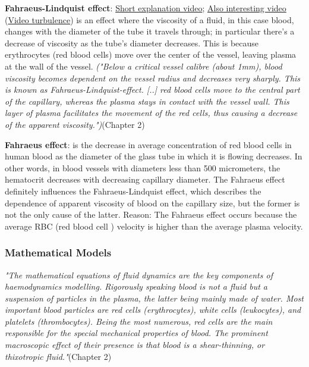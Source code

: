 \documentclass[11pt,letterpaper]{article}
\begin{document}
\textbf{Fahraeus-Lindquist effect}: \href{https://www.youtube.com/watch?v=IDrHCGcq-ak}{Short explanation video}; \href{https://www.combster.tv/t/1317657-fhruslindqvist-effect?utm_source=spectroom_web&utm_medium=banner&utm_campaign=cross_promo}{Also interesting video} (\href{https://www.youtube.com/watch?v=sWfCKdjxLc0}{Video turbulence}) \newline
is an effect where the viscosity of a fluid, in this case blood, changes with the diameter of the tube it travels through; in particular there's a decrease of viscosity as the tube's diameter decreases. This is because erythrocytes (red blood cells) move over the center of the vessel, leaving plasma at the wall of the vessel. \textit{("Below a critical vessel calibre (about 1mm), blood viscosity becomes dependent on the vessel radius and decreases very sharply. This is known as Fahraeus-Lindquist-effect. [..] red blood cells move to the central part of the capillary, whereas the plasma stays in contact with the vessel wall. This layer of plasma facilitates the movement of the red cells, thus causing a decrease of the apparent viscosity.")}(Chapter 2)

\textbf{Fahraeus effect}:  is the decrease in average concentration of red blood cells in human blood as the diameter of the glass tube in which it is flowing decreases. In other words, in blood vessels with diameters less than 500 micrometers, the hematocrit decreases with decreasing capillary diameter. The Fahraeus effect definitely influences the Fahraeus-Lindquist effect, which describes the dependence of apparent viscosity of blood on the capillary size, but the former is not the only cause of the latter.  \newline
Reason: The Fahraeus effect occurs because the average RBC (red blood cell ) velocity is higher than the average plasma velocity.

\subsubsection*{Mathematical Models}
\textit{"The mathematical equations of fluid dynamics are the key components of haemodynamics modelling. Rigorously speaking blood is not a fluid but a suspension of particles in the plasma, the latter being mainly made of water. Most important blood particles are red cells (erythrocytes), white cells (leukocytes), and platelets (thrombocytes). Being the most numerous, red cells are the main responsible for the special mechanical properties of blood. The prominent macroscopic effect of their presence is that blood is a shear-thinning, or thixotropic fluid."}(Chapter 2)
\end{document}
